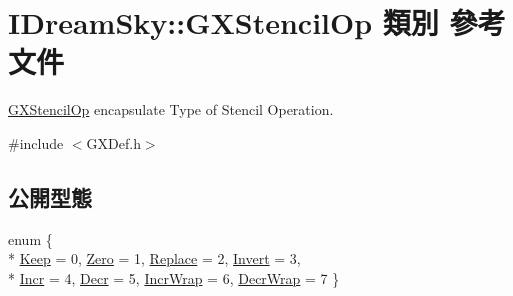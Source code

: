 \hypertarget{class_i_dream_sky_1_1_g_x_stencil_op}{}\section{I\+Dream\+Sky\+:\+:G\+X\+Stencil\+Op 類別 參考文件}
\label{class_i_dream_sky_1_1_g_x_stencil_op}


\hyperlink{class_i_dream_sky_1_1_g_x_stencil_op}{G\+X\+Stencil\+Op} encapsulate Type of Stencil Operation.  




{\ttfamily \#include $<$G\+X\+Def.\+h$>$}

\subsection*{公開型態}
\begin{DoxyCompactItemize}
\item 
enum \{ \\*
\hyperlink{class_i_dream_sky_1_1_g_x_stencil_op_a533e11d2d23e3d4be076ac38a613cb65a4bea37edd4aacc0f93579dfcb9a26e7f}{Keep} = 0, 
\hyperlink{class_i_dream_sky_1_1_g_x_stencil_op_a533e11d2d23e3d4be076ac38a613cb65ae0fd58e7d37079ec8e7932e8f2278edb}{Zero} = 1, 
\hyperlink{class_i_dream_sky_1_1_g_x_stencil_op_a533e11d2d23e3d4be076ac38a613cb65a376f642dc266f61f1db4c74a86acd373}{Replace} = 2, 
\hyperlink{class_i_dream_sky_1_1_g_x_stencil_op_a533e11d2d23e3d4be076ac38a613cb65a41bb9dae4c04e6bbde20a3bfdcacbb5a}{Invert} = 3, 
\\*
\hyperlink{class_i_dream_sky_1_1_g_x_stencil_op_a533e11d2d23e3d4be076ac38a613cb65a6a8d69d0473aa0c5c12748d88520cc11}{Incr} = 4, 
\hyperlink{class_i_dream_sky_1_1_g_x_stencil_op_a533e11d2d23e3d4be076ac38a613cb65aed65ba2dba8994609e0e261280a84246}{Decr} = 5, 
\hyperlink{class_i_dream_sky_1_1_g_x_stencil_op_a533e11d2d23e3d4be076ac38a613cb65a4c0c3359f70fea479f2699471ae5927f}{Incr\+Wrap} = 6, 
\hyperlink{class_i_dream_sky_1_1_g_x_stencil_op_a533e11d2d23e3d4be076ac38a613cb65aecd9f34d00e82c60e57be856547c2d91}{Decr\+Wrap} = 7
 \}
\end{DoxyCompactItemize}
